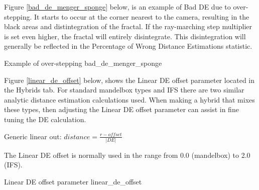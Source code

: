Figure \ref{bad_de_menger_sponge} below, is an example of Bad DE due to over-stepping. It starts to occur at the corner nearest to the camera, resulting in the black areas and distintegration of the fractal. If the ray-marching step multiplier is set even higher, the fractal will entirely disintegrate. This disintegration will generally be reflected in the Percentage of Wrong Distance Estimations statistic.

{Example of over-stepping}
{bad_de_menger_sponge}

Figure \ref{linear_de_offset} below, shows the Linear DE offset parameter located in the Hybrids tab.
For standard mandelbox types and IFS there are two similar analytic distance estimation calculations used. When making a hybrid that mixes these types, then adjusting the Linear DE offset parameter can assist in fine tuning the DE calculation.

Generic  linear out: $ distance = \frac{r - offset}{\lvert DE \rvert} $

The Linear DE offset is normally used in the range from 0.0 (mandelbox) to 2.0 (IFS).

 
{Linear DE offset parameter}
{linear_de_offset}


